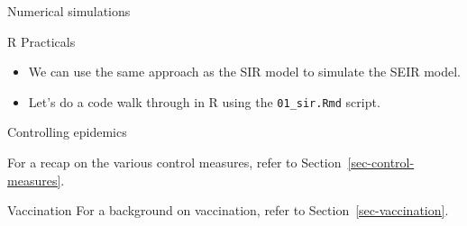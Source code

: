 \documentclass[
  ignorenonframetext,
]{beamer}
\begin{document}
\begin{frame}[fragile]
\begin{block}{Numerical simulations}
\label{numerical-simulations-1}
\begin{block}{R Practicals}
\label{r-practicals}
\begin{itemize}
\item
  We can use the same approach as the SIR model to simulate the SEIR
  model.
\item
  Let's do a code walk through in R using the \texttt{01\_sir.Rmd}
  script.
\end{itemize}
\end{block}
\end{block}
\end{frame}

\begin{frame}{Controlling epidemics}
\label{controlling-epidemics}
\begin{tcolorbox}[enhanced jigsaw, toprule=.15mm, opacityback=0, bottomtitle=1mm, opacitybacktitle=0.6, colframe=quarto-callout-note-color-frame, titlerule=0mm, breakable, colback=white, title=\textcolor{quarto-callout-note-color}{\faInfo}\hspace{0.5em}{Note}, left=2mm, colbacktitle=quarto-callout-note-color!10!white, arc=.35mm, coltitle=black, bottomrule=.15mm, rightrule=.15mm, leftrule=.75mm, toptitle=1mm]

For a recap on the various control measures, refer to
Section~\ref{sec-control-measures}.

\end{tcolorbox}
\end{frame}

\begin{frame}
\begin{block}{Vaccination}
\label{vaccination}
For a background on vaccination, refer to Section~\ref{sec-vaccination}.
\end{block}
\end{frame}
\end{document}
